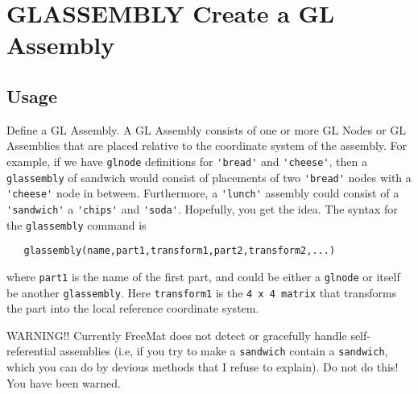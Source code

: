 \section{GLASSEMBLY Create a GL Assembly}

\subsection{Usage}

Define a GL Assembly.  A GL Assembly consists of one or more
GL Nodes or GL Assemblies that are placed relative to the 
coordinate system of the assembly.  For example, if we have
\verb|glnode| definitions for \verb|'bread'| and \verb|'cheese'|, then
a \verb|glassembly| of sandwich would consist of placements of
two \verb|'bread'| nodes with a \verb|'cheese'| node in between.
Furthermore, a \verb|'lunch'| assembly could consist of a \verb|'sandwich'|
a \verb|'chips'| and \verb|'soda'|.  Hopefully, you get the idea.  The
syntax for the \verb|glassembly| command is
\begin{verbatim}
   glassembly(name,part1,transform1,part2,transform2,...)
\end{verbatim}
where \verb|part1| is the name of the first part, and could be
either a \verb|glnode| or itself be another \verb|glassembly|.  
Here \verb|transform1| is the \verb|4 x 4 matrix| that transforms
the part into the local reference coordinate system.

WARNING!! Currently FreeMat does not detect or gracefully handle 
self-referential assemblies (i.e, if you try to make a \verb|sandwich| 
contain a \verb|sandwich|, which you can do by devious methods that I 
refuse to explain).  Do not do this!  You have been warned.
